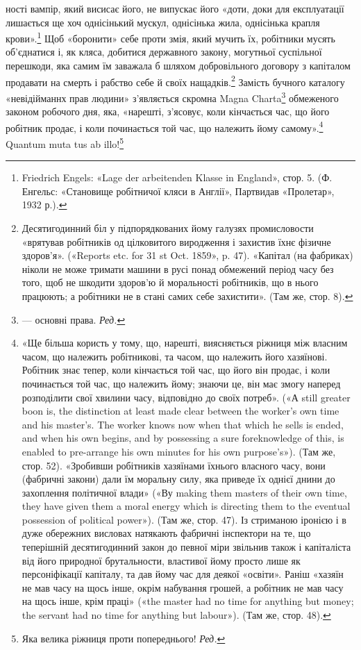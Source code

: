 ності вампір, який висисає його, не випускає його «доти, доки для
експлуатації лишається ще хоч однісінький мускул, однісінька
жила, однісінька крапля крови».\footnote{
Friedrich Engels: «Lage der arbeitenden Klasse in England»,
стор. 5. (Ф. Енгельс: «Становище робітничої кляси в Англії», Партвидав
«Пролетар», 1932 р.).
} Щоб «боронити» себе проти
змія, який мучить їх, робітники мусять об’єднатися і, як кляса,
добитися державного закону, могутньої суспільної перешкоди,
яка самим їм заважала б шляхом добровільного договору з капіталом
продавати на смерть і рабство себе й своїх нащадків.\footnote{
Десятигодинний біл у підпорядкованих йому галузях промисловости
«врятував робітників од цілковитого виродження і захистив їхнє
фізичне здоров’я». («Reports etc. for 31 st Oct. 1859», p. 47). «Капітал
(на фабриках) ніколи не може тримати машини в русі понад обмежений
період часу без того, щоб не шкодити здоров’ю й моральності робітників,
що в нього працюють; а робітники не в стані самих себе захистити».
(Там же, стор. 8).
}
Замість бучного каталогу «невідійманнх прав людини» з’являється
скромна Magna Charta\footnote*{
— основні права. \emph{Ред.}
} обмеженого законом робочого
дня, яка, «нарешті, з’ясовує, коли кінчається час, що його робітник
продає, і коли починається той час, що належить йому самому».\footnote{
«Ще більша користь у тому, що, нарешті, виясняється ріжниця
між власним часом, що належить робітникові, та часом, що належить
його хазяїнові. Робітник знає тепер, коли кінчається той час, що його
він продає, і коли починається той час, що належить йому; знаючи це,
він має змогу наперед розподілити свої хвилини часу, відповідно до своїх
потреб». («А still greater boon is, the distinction at least made clear between
the worker’s own time and his master’s. The worker knows now when
that which he sells is ended, and when his own begins, and by possessing a sure
foreknowledge of this, is enabled to pre-arrange his own minutes for his
own purpose’s»). (Там же, стор. 52). «Зробивши робітників хазяїнами
їхнього власного часу, вони (фабричні закони) дали їм моральну силу,
яка приведе їх однієї днини до захоплення політичної влади» («Ву
making them masters of their own time, they have given them a moral energy
which is directing them to the eventual possession of political power»).
(Там же, стор. 47). Із стриманою іронією і в дуже обережних висловах
натякають фабричні інспектори на те, що теперішній десятигодинний
закон до певної міри звільнив також і капіталіста від його природної
брутальности, властивої йому просто лише як персоніфікації капіталу, та
дав йому час для деякої «освіти». Раніш «хазяїн не мав часу на щось
інше, окрім набування грошей, а робітник не мав часу на щось інше,
крім праці» («the master had no time for anything but money; the servant
had no time for anything but labour»). (Там же, стор. 48).
}
Quantum muta tus ab illo!\footnote*{
Яка велика ріжниця проти попереднього! \emph{Ред.}
}

